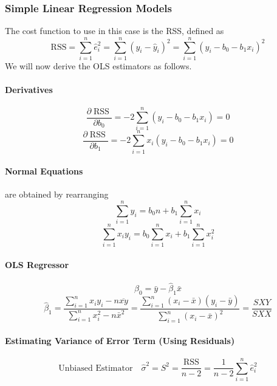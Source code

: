 \documentclass[11pt]{article}
\begin{document}
\subsubsection{Simple Linear Regression Models}
The cost function to use in this case is the RSS, defined as
\begin{equation*}
    \mathrm{RSS}=\sum_{i=1}^{n} \hat{e}_{i}^{2}=\sum_{i=1}^{n}\left(y_{i}-\hat{y}_{i}\right)^{2}=\sum_{i=1}^{n}\left(y_{i}-b_{0}-b_{1} x_{i}\right)^{2}
\end{equation*}
We will now derive the OLS estimators as follows. 
\paragraph{Derivatives}
\begin{equation*}
    \frac{\partial \operatorname{RSS}}{\partial b_{0}}=-2 \sum_{i=1}^{n}\left(y_{i}-b_{0}-b_{1} x_{i}\right)=0
\end{equation*}
\begin{equation*}
    \frac{\partial \operatorname{RSS}}{\partial b_{1}}=-2 \sum_{i=1}^{n} x_{i}\left(y_{i}-b_{0}-b_{1} x_{i}\right)=0
\end{equation*}
\paragraph{Normal Equations} are obtained by rearranging
\begin{equation}
    \sum_{i=1}^{n} y_{i}=b_{0} n+b_{1} \sum_{i=1}^{n} x_{i}
\end{equation}
\begin{equation}
    \sum_{i=1}^{n} x_{i} y_{i}=b_{0} \sum_{i=1}^{n} x_{i}+b_{1} \sum_{i=1}^{n} x_{i}^{2}
\end{equation}
\paragraph{OLS Regressor}
\begin{equation*}
    \hat{\beta}_{0}=\bar{y}-\hat{\beta}_{1} \bar{x}
\end{equation*}
\begin{equation*}
    \hat{\beta}_{1}=\frac{\sum_{i=1}^{n} x_{i} y_{i}-n \overline{x y}}{\sum_{i=1}^{n} x_{i}^{2}-n \bar{x}^{2}}=\frac{\sum_{i=1}^{n}\left(x_{i}-\bar{x}\right)\left(y_{i}-\bar{y}\right)}{\sum_{i=1}^{n}\left(x_{i}-\bar{x}\right)^{2}}=\frac{S X Y}{S X X}
\end{equation*}
\paragraph{Estimating Variance of Error Term (Using Residuals)}
\begin{equation*}
    \text{Unbiased Estimator} \quad \hat{\sigma}^2 = S^{2}=\frac{\mathrm{RSS}}{n-2}=\frac{1}{n-2} \sum_{i=1}^{n} \hat{e}_{i}^{2}
\end{equation*}
\end{document}
